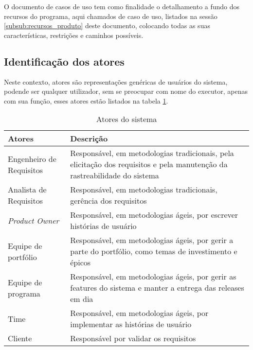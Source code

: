 
O documento de casos de uso tem como finalidade o detalhamento a fundo dos recursos do programa, aqui chamados de caso de uso, listados na sessão \ref{subsub:recursos_produto} deste documento, colocando todas as suas características, restrições e caminhos possíveis.

\subsection{Identificação dos atores}

Neste contexto, atores são representações genéricas de usuários do sistema, podende ser qualquer utilizador, sem se preocupar com nome do executor, apenas com sua função, esses atores estão listados na tabela \ref{tab:atores}.

\begin{table}[H]
\centering
\begin{tabular}{|l|p{8cm}|}

\hline
\textbf{Atores} &
\textbf{Descrição}
\\ \hline
Engenheiro de Requisitos &
Responsável, em metodologias tradicionais, pela elicitação dos requisitos e pela manutenção da rastreabilidade do sistema
\\ \hline
Analista de Requisitos &
Responsável, em metodologias tradicionais, gerência dos requisitos
\\ \hline
\textit{Product Owner} &
Responsável, em metodologias ágeis, por escrever histórias de usuário
\\ \hline
Equipe de portfólio &
Responsável, em metodologias ágeis, por gerir a parte do portfólio, como temas de investimento e épicos
\\ \hline
Equipe de programa &
Responsável, em metodologias ágeis, por gerir as features do sistema e manter a entrega das releases em dia
\\ \hline
Time &
Responsável, em metodologias ágeis, por implementar as histórias de usuário
\\ \hline
Cliente &
Responsável por validar os requisitos
\\ \hline

\end{tabular}
\caption{Atores do sistema}
\label{tab:atores}
\end{table}

